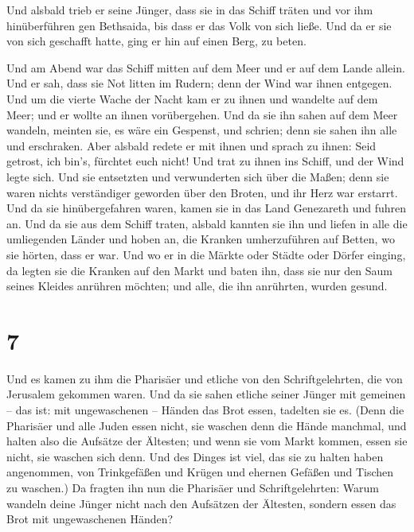  Und alsbald trieb er seine Jünger, dass sie in das
Schiff träten und vor ihm hinüberführen gen Bethsaida, bis dass er das
Volk von sich ließe.  Und da er sie von sich geschafft
hatte, ging er hin auf einen Berg, zu beten.

 Und am Abend war das Schiff mitten auf dem Meer und er
auf dem Lande allein.  Und er sah, dass sie Not litten im
Rudern; denn der Wind war ihnen entgegen. Und um die vierte Wache der
Nacht kam er zu ihnen und wandelte auf dem Meer;  und er
wollte an ihnen vorübergehen. Und da sie ihn sahen auf dem Meer wandeln,
meinten sie, es wäre ein Gespenst, und schrien;  denn sie
sahen ihn alle und erschraken. Aber alsbald redete er mit ihnen und
sprach zu ihnen: Seid getrost, ich bin's, fürchtet euch nicht!
 Und trat zu ihnen ins Schiff, und der Wind legte sich.
Und sie entsetzten und verwunderten sich über die Maßen; 
denn sie waren nichts verständiger geworden über den Broten, und ihr
Herz war erstarrt.  Und da sie hinübergefahren waren,
kamen sie in das Land Genezareth und fuhren an.  Und da
sie aus dem Schiff traten, alsbald kannten sie ihn  und
liefen in alle die umliegenden Länder und hoben an, die Kranken
umherzuführen auf Betten, wo sie hörten, dass er war. 
Und wo er in die Märkte oder Städte oder Dörfer einging, da legten sie
die Kranken auf den Markt und baten ihn, dass sie nur den Saum seines
Kleides anrühren möchten; und alle, die ihn anrührten, wurden gesund.

\hypertarget{section-6}{%
\section{7}\label{section-6}}

 Und es kamen zu ihm die Pharisäer und etliche von den
Schriftgelehrten, die von Jerusalem gekommen waren.  Und
da sie sahen etliche seiner Jünger mit gemeinen -- das ist: mit
ungewaschenen -- Händen das Brot essen, tadelten sie es. 
(Denn die Pharisäer und alle Juden essen nicht, sie waschen denn die
Hände manchmal, und halten also die Aufsätze der Ältesten;
 und wenn sie vom Markt kommen, essen sie nicht, sie
waschen sich denn. Und des Dinges ist viel, das sie zu halten haben
angenommen, von Trinkgefäßen und Krügen und ehernen Gefäßen und Tischen
zu waschen.)  Da fragten ihn nun die Pharisäer und
Schriftgelehrten: Warum wandeln deine Jünger nicht nach den Aufsätzen
der Ältesten, sondern essen das Brot mit ungewaschenen Händen?

